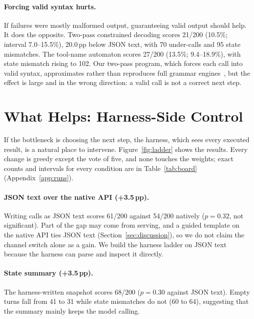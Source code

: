 \documentclass[11pt]{article}
\newcommand{\pp}{\,pp\xspace}
\begin{document}
\paragraph{Forcing valid syntax hurts.} If failures were mostly malformed output, guaranteeing valid output should help. It does the opposite. Two-pass constrained decoding scores 21/200 (10.5\%; interval 7.0--15.5\%), 20.0\pp below JSON text, with 70 under-calls and 95 state mismatches. The tool-name automaton scores 27/200 (13.5\%; 9.4--18.9\%), with state mismatch rising to 102. Our two-pass program, which forces each call into valid syntax, approximates rather than reproduces full grammar engines~\cite{dong2026xgrammar2}, but the effect is large and in the wrong direction: a valid call is not a correct next step.

\FloatBarrier
\section{What Helps: Harness-Side Control}
\label{sec:helps}

If the bottleneck is choosing the next step, the harness, which sees every executed result, is a natural place to intervene. Figure~\ref{fig:ladder} shows the results. Every change is greedy except the vote of five, and none touches the weights; exact counts and intervals for every condition are in Table~\ref{tab:board} (Appendix~\ref{app:runs}).

\paragraph{JSON text over the native API (+3.5\pp).} Writing calls as JSON text scores 61/200 against 54/200 natively ($p=0.32$, not significant). Part of the gap may come from serving, and a guided template on the native API ties JSON text (Section~\ref{sec:discussion}), so we do not claim the channel switch alone as a gain. We build the harness ladder on JSON text because the harness can parse and inspect it directly.

\paragraph{State summary (+3.5\pp).} The harness-written snapshot scores 68/200 ($p=0.30$ against JSON text). Empty turns fall from 41 to 31 while state mismatches do not (60 to 64), suggesting that the summary mainly keeps the model calling.
\end{document}
